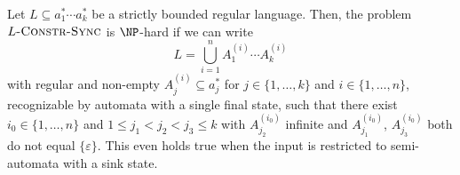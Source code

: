 \begin{proposition}
\label{prop:stricly_bounded_np_hard}
 Let $L \subseteq a_1^* \cdots a_k^*$ be a strictly bounded regular
 language. Then, the problem
 $L\textsc{-Constr-Sync}$ is $\NP$-hard
 if we can write 
 \[ 
  L = \bigcup_{i=1}^n A_1^{(i)} \cdots A_k^{(i)}
 \]
 with regular and non-empty $A_j^{(i)} \subseteq a_j^*$
 for $j \in \{1,\ldots, k\}$ and $i \in \{1,\ldots, n\}$,
 recognizable by automata with a single final state,
 such that there exist $i_0 \in \{1,\ldots,n\}$ and $1 \le j_1 < j_2 < j_3 \le k$ %
 with $A_{j_2}^{(i_0)}$ infinite and $A_{j_1}^{(i_0)}$, $A_{j_3}^{(i_0)}$
 both do not equal $\{\varepsilon\}$. %
 This even holds true when the input is restricted to semi-automata with a sink state.
\end{proposition}
